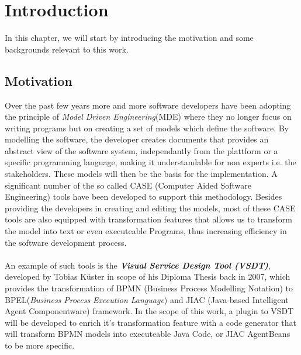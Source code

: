 \chapter{Introduction}
In this chapter, we will start by introducing the motivation and some backgrounds relevant to this work. 
\section{Motivation}
\label{sec:Motivation}
Over the past few years more and more software developers have been adopting the principle of \textit{Model Driven Engineering}(MDE) where 
they no longer focus on writing programs but on creating a set of models which define the software. By modelling the software, the developer creates documents that provides an abstract view of the software system, independantly from the plattform or a specific programming language, making it understandable for non experts i.e. the stakeholders. These models will then be the basis for the implementation. A significant number of the so called  CASE (Computer Aided Software Engineering) tools have been developed to support this methodology. Besides providing the developers in creating and editing the models, most of these CASE tools are also equipped with transformation features that allows us to transform the model into text or even executeable Programs, thus increasing efficiency in the software development process. \\\\
An example of such tools is the \textbf{\textit{Visual Service Design Tool (VSDT)}}, developed by Tobias K\"uster in scope of his Diploma Thesis
back in 2007, which provides the transformation of BPMN (Business Process Modelling Notation) to BPEL(\textit{Business Process Execution Language}) and JIAC (Java-based Intelligent Agent Componentware) framework. In the scope of this work, a plugin to VSDT will be developed to enrich it's transformation feature with a code generator that will transform BPMN models into executeable Java Code, or JIAC AgentBeans to be more specific. 
\nocite{test}
